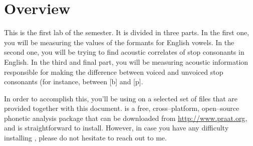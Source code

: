 \section{Overview}

This is the first lab of the semester. It is divided in three parts. In the first one, you will be measuring the values of the formants for English vowels. In the second one, you will be trying to find acoustic correlates of stop consonants in English. In the third and final part, you will be measuring acoustic information responsible for making the difference between voiced and unvoiced stop consonants (for instance, between [b] and [p].

In order to accomplish this, you'll be using \Praat{} on a selected set of files that are provided together with this document. \Praat{} is a free, cross--platform, open--source phonetic analysis package that can be downloaded from \href{http://www.praat.org}{http://www.praat.org}, and is straightforward to install. However, in case you have any difficulty installing \Praat{}, please do not hesitate to reach out to me.

